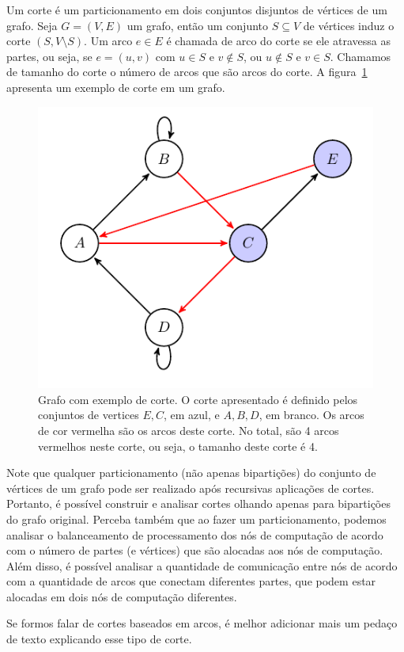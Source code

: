 \documentclass[conference]{IEEEtran}
\begin{document}
Um corte é um particionamento em dois conjuntos disjuntos de vértices de
um grafo. Seja $G = (V, E)$ um grafo, então um conjunto $S \subseteq V$ 
de vértices induz o corte $(S, V \setminus S)$. Um arco $e \in E$ é
chamada de arco do corte se ele atravessa as partes, ou seja, se
$e = (u, v)$ com $u \in S$ e $v \notin S$, ou $u \notin S$ e $v \in S$.
Chamamos de tamanho do corte o número de arcos que são arcos do corte. A
figura~\ref{fig:example_cut} apresenta um exemplo de corte em um grafo.

\begin{figure}
    \begin{center}
        \includegraphics[width=.5\textwidth]{fund_conc/cut_example.pdf}
    \end{center}
    \caption{Grafo com exemplo de corte. O corte apresentado é definido
    pelos conjuntos de vertices ${E, C}$, em azul, e $A, B, D$, em 
    branco. Os arcos de cor vermelha são os arcos deste corte. No total,
    são 4 arcos vermelhos neste corte, ou seja, o tamanho deste corte
    é 4.}
    \label{fig:example_cut}
\end{figure}

Note que qualquer particionamento (não apenas bipartições) do conjunto 
de vértices de um grafo pode ser realizado após recursivas aplicações de 
cortes. Portanto, é possível construir e analisar cortes olhando apenas
para bipartições do grafo original. Perceba também que ao fazer um 
particionamento, podemos analisar o balanceamento de processamento 
dos nós de computação de acordo com o número de partes (e vértices) 
que são alocadas aos nós de computação. Além disso, é possível analisar
a quantidade de comunicação entre nós de acordo com a quantidade de
arcos que conectam diferentes partes, que podem estar alocadas em dois 
nós de computação diferentes.

{\color{blue} Se formos falar de cortes baseados em arcos, é melhor
adicionar mais um pedaço de texto explicando esse tipo de corte.}
\end{document}
